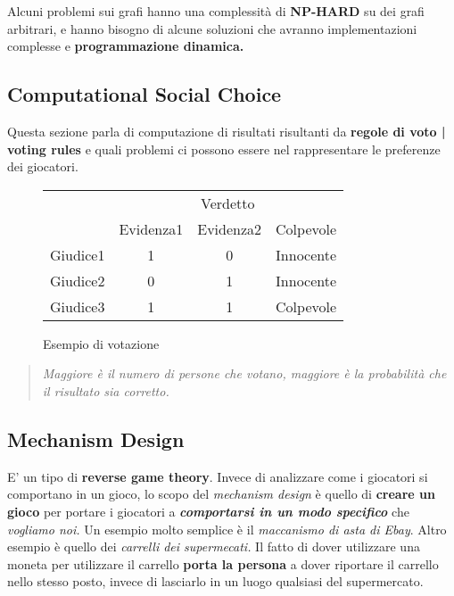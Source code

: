 Alcuni problemi sui grafi hanno una complessità di \textbf{NP-HARD} su dei
grafi arbitrari, e hanno bisogno di alcune soluzioni che avranno
implementazioni complesse e \textbf{programmazione dinamica.}

\subsection{Computational Social Choice}
\label{sub:computational_social_choice}

Questa sezione parla di computazione di risultati risultanti da \textbf{regole
    di voto | voting rules} e quali problemi ci possono essere nel rappresentare le
preferenze dei giocatori. \
\begin{figure}[H]
    \begin{center}
        \begin{tabular}{c|ccc}
            \multicolumn{1}{c}{} & \multicolumn{3}{c}{Verdetto}                         \\
            \cline{2-4}
                                 & Evidenza1                    & Evidenza2 & Colpevole \\
            \cline{1-4}
            Giudice1             & 1                            & 0         & Innocente \\
            Giudice2             & 0                            & 1         & Innocente \\
            Giudice3             & 1                            & 1         & Colpevole \\
            \cline{1-4}
        \end{tabular}
    \end{center}
    \caption{Esempio di votazione}
\end{figure}

\begin{quote}
    \textit{Maggiore è il numero di persone che votano, maggiore è la probabilità che
        il risultato sia corretto.}
\end{quote}

\subsection{Mechanism Design}

E' un tipo di \textbf{reverse game theory}. Invece di analizzare come i
giocatori si comportano in un gioco, lo scopo del \textit{mechanism design} è
quello di \textbf{creare un gioco} per portare i giocatori a
\textbf{\textit{comportarsi in un modo specifico}} che \textit{vogliamo noi.}
Un esempio molto semplice è il \textit{maccanismo di asta di Ebay}. Altro
esempio è quello dei \textit{carrelli dei supermecati.} Il fatto di dover
utilizzare una moneta per utilizzare il carrello \textbf{porta la persona} a
dover riportare il carrello nello stesso posto, invece di lasciarlo in un luogo
qualsiasi del supermercato.

